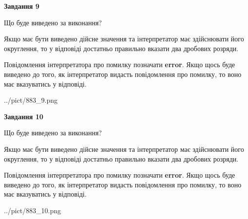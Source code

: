 \documentclass[12pt, ukrainian]{article}
\begin{document}
{\begin {Large}
{\begin {center}\textbf{Завдання 9}\end {center}}\par
Що буде виведено за виконання? \par

Якщо має бути виведено дійсне значення та інтерпретатор має здійснювати його округлення, 
то у відповіді достатньо правильно вказати два дробових розряди.

Повідомлення інтерпретатора про помилку позначати \textbf{error}.
Якщо щось буде виведено до того, як інтерпретатор видасть повідомлення про помилку, 
то воно має вказуватись у відповіді. \par

\begin{center}
	{../pict/883_9.png}
\end{center}
\newpage

{\begin {center}\textbf{Завдання 10}\end {center}}\par
Що буде виведено за виконання? \par

Якщо має бути виведено дійсне значення та інтерпретатор має здійснювати його округлення, 
то у відповіді достатньо правильно вказати два дробових розряди.

Повідомлення інтерпретатора про помилку позначати \textbf{error}.
Якщо щось буде виведено до того, як інтерпретатор видасть повідомлення про помилку, 
то воно має вказуватись у відповіді. \par

\begin{center}
	{../pict/883_10.png}
\end{center}
\newpage

\end {Large}}
\end{document}
